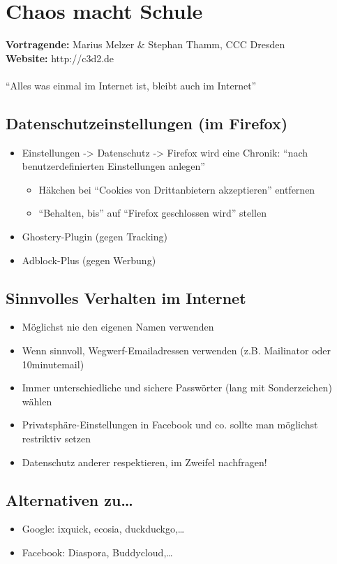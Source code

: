\documentclass[a5paper]{scrartcl}
\begin{document}
\thispagestyle{empty}

\section*{Chaos macht Schule}

\textbf{Vortragende:} Marius Melzer \& Stephan Thamm, CCC Dresden\\
\textbf{Website:} http://c3d2.de\\
\\
``Alles was einmal im Internet ist, bleibt auch im Internet''
\subsection*{Datenschutzeinstellungen (im Firefox)}
\begin{itemize}
  \item Einstellungen -> Datenschutz -> Firefox wird eine Chronik: ``nach benutzerdefinierten Einstellungen anlegen''
    \begin{itemize}
      \item Häkchen bei ``Cookies von Drittanbietern akzeptieren'' entfernen
      \item ``Behalten, bis'' auf ``Firefox geschlossen wird'' stellen
    \end{itemize}
  \item Ghostery-Plugin (gegen Tracking)
  \item Adblock-Plus (gegen Werbung)
\end{itemize}
\subsection*{Sinnvolles Verhalten im Internet}
\begin{itemize}
  \item Möglichst nie den eigenen Namen verwenden
  \item Wenn sinnvoll, Wegwerf-Emailadressen verwenden (z.B. Mailinator oder 10minutemail)
  \item Immer unterschiedliche und sichere Passwörter (lang mit Sonderzeichen) wählen
  \item Privatsphäre-Einstellungen in Facebook und co. sollte man möglichst restriktiv setzen
  \item Datenschutz anderer respektieren, im Zweifel nachfragen!
\end{itemize}
\subsection*{Alternativen zu\ldots}
\begin{itemize}
  \item Google: ixquick, ecosia, duckduckgo,\ldots
  \item Facebook: Diaspora, Buddycloud,\ldots
\end{itemize}
\end{document}

